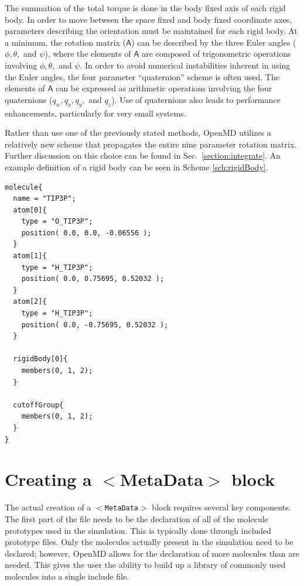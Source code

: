 \documentclass[]{book}
\begin{document}
The summation of the total torque is done in the body fixed axis of
each rigid body. In order to move between the space fixed and body
fixed coordinate axes, parameters describing the orientation must be
maintained for each rigid body. At a minimum, the rotation matrix
($\mathsf{A}$) can be described by the three Euler angles ($\phi,
\theta,$ and $\psi$), where the elements of $\mathsf{A}$ are composed of
trigonometric operations involving $\phi, \theta,$ and
$\psi$.\cite{Goldstein01} In order to avoid numerical instabilities
inherent in using the Euler angles, the four parameter ``quaternion''
scheme is often used. The elements of $\mathsf{A}$ can be expressed as
arithmetic operations involving the four quaternions ($q_w, q_x, q_y,$
and $q_z$).\cite{Allen87} Use of quaternions also leads to
performance enhancements, particularly for very small
systems.\cite{Evans77}

Rather than use one of the previously stated methods, {\sc OpenMD}
utilizes a relatively new scheme that propagates the entire nine
parameter rotation matrix. Further discussion on this choice can be
found in Sec.~\ref{section:integrate}. An example definition of a
rigid body can be seen in Scheme
\ref{sch:rigidBody}.

\begin{lstlisting}[float,caption={[Defining rigid bodies]A sample
definition of a molecule containing a rigid body and a cutoff
group},label={sch:rigidBody}] 
molecule{
  name = "TIP3P";
  atom[0]{
    type = "O_TIP3P";
    position( 0.0, 0.0, -0.06556 );
  }
  atom[1]{
    type = "H_TIP3P";
    position( 0.0, 0.75695, 0.52032 );
  }
  atom[2]{
    type = "H_TIP3P";
    position( 0.0, -0.75695, 0.52032 );
  }

  rigidBody[0]{
    members(0, 1, 2);
  }

  cutoffGroup{
    members(0, 1, 2);
  }
}
\end{lstlisting}

\section{\label{sec:miscConcepts}Creating a $<$MetaData$>$ block}

The actual creation of a {\tt $<$MetaData$>$} block requires several key
components. The first part of the file needs to be the declaration of
all of the molecule prototypes used in the simulation. This is
typically done through included prototype files. Only the molecules
actually present in the simulation need to be declared; however, {\sc
OpenMD} allows for the declaration of more molecules than are
needed. This gives the user the ability to build up a library of
commonly used molecules into a single include file.
\end{document}
